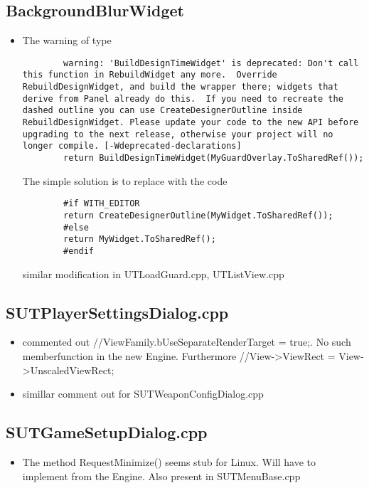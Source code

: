 \documentclass{article}
\begin{document}
  \subsection{BackgroundBlurWidget}
  \begin{itemize}
  \item The warning of type
    \lstset{language=c++}
    \begin{lstlisting}
        warning: 'BuildDesignTimeWidget' is deprecated: Don't call this function in RebuildWidget any more.  Override RebuildDesignWidget, and build the wrapper there; widgets that derive from Panel already do this.  If you need to recreate the dashed outline you can use CreateDesignerOutline inside RebuildDesignWidget. Please update your code to the new API before upgrading to the next release, otherwise your project will no longer compile. [-Wdeprecated-declarations]
        return BuildDesignTimeWidget(MyGuardOverlay.ToSharedRef());
      \end{lstlisting}
      The simple solution is to replace with the code
\lstset{language=c++}
      \begin{lstlisting}
        #if WITH_EDITOR
        return CreateDesignerOutline(MyWidget.ToSharedRef());
        #else
        return MyWidget.ToSharedRef();
        #endif
      \end{lstlisting}
      similar modification in {\color{filecolor}UTLoadGuard.cpp}, {\color{filecolor}UTListView.cpp}
    \end{itemize}
    \subsection{SUTPlayerSettingsDialog.cpp}
    \begin{itemize}
    \item commented out //ViewFamily.bUseSeparateRenderTarget = true;.  No such memberfunction in the new Engine.  Furthermore //View->ViewRect = View->UnscaledViewRect;
      \item simillar comment out for SUTWeaponConfigDialog.cpp
    \end{itemize}
    \subsection{SUTGameSetupDialog.cpp}
    \begin{itemize}
    \item The method RequestMinimize() seems stub for Linux.  Will have to implement from the Engine.  Also present in {\color{filecolor}SUTMenuBase.cpp}
    \end{itemize}
\end{document}
